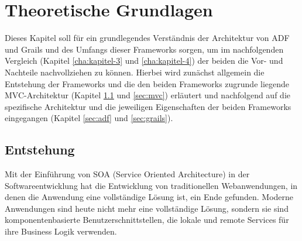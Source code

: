 \section{Theoretische Grundlagen}
\label{cha:kapitel-2}
Dieses Kapitel soll für ein grundlegendes Verständnis der Architektur von ADF und Grails und des Umfangs dieser Frameworks sorgen, um im nachfolgenden Vergleich (Kapitel \ref{cha:kapitel-3} und \ref{cha:kapitel-4}) der beiden die Vor- und Nachteile nachvollziehen zu können. Hierbei wird zunächst allgemein die Entstehung der Frameworks und die den beiden Frameworks zugrunde liegende MVC-Architektur (Kapitel \ref{sec:entstehung} und \ref{sec:mvc}) erläutert und nachfolgend auf die spezifische Architektur und die jeweiligen Eigenschaften der beiden Frameworks eingegangen (Kapitel \ref{sec:adf} und \ref{sec:grails}).

\subsection{Entstehung}
\label{sec:entstehung}
Mit der Einführung von SOA (Service Oriented Architecture) in der Softwareentwicklung hat die Entwicklung von traditionellen Webanwendungen, in denen die Anwendung eine vollständige Lösung ist, ein Ende gefunden. Moderne Anwendungen sind heute nicht mehr eine vollständige Lösung, sondern sie sind komponentenbasierte Benutzerschnittstellen, die lokale und remote Services für ihre Business Logik verwenden. \autocite[S. XXI]{OFDG2010}
